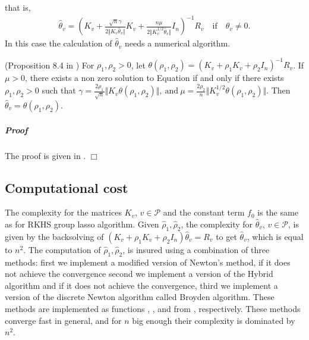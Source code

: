 that is, 
\begin{align}\label{tthatgrp}
\widehat{\theta}_v=(K_v+\frac{\sqrt{n}\gamma}{2\Vert K_v\widehat{\theta}_v\Vert}K_v+\frac{n\mu}{2\Vert K_v^{1/2}\widehat{\theta}_v\Vert}I_n)^{-1}R_v\quad \text{if}\quad \widehat{\theta}_v\neq0.
\end{align}
In this case the calculation of $\widehat{\theta}_v$ needs a numerical algorithm.
\begin{prop} (Proposition 8.4 in \citet{huet:hal-01434895})\label{theo:ttahatgrp}
For $\rho_1,\rho_2>0$, let $\theta(\rho_1,\rho_2)=(K_v+\rho_1K_v+\rho_2I_n)^{-1}R_v$. If $\mu>0$, there exists a non zero solution to Equation  if and only if there exists $\rho_1,\rho_2>0$ such that $\gamma=\frac{2\rho_1}{\sqrt{n}}\Vert K_v\theta(\rho_1,\rho_2)\Vert,\:\mbox{and}\:\mu=\frac{2\rho_2}{n}\Vert K^{1/2}_v\theta(\rho_1,\rho_2)\Vert.$ 
Then $\widehat{\theta}_v=\theta(\rho_1,\rho_2)$. 
\end{prop}
\subparagraph*{Proof} The proof is given in \citet{huet:hal-01434895}.
\hfill $\Box$ 

\subsection{Computational cost}
The complexity for the matrices $K_v$, $v\in\mathcal{P}$ and the constant term $f_0$ is the same as for RKHS group lasso algorithm. Given $\widehat{\rho}_1,\widehat{\rho}_2$, the complexity for $\widehat{\theta}_v$, $v\in\mathcal{P}$, is given by the backsolving of $(K_v+\rho_1K_v+\rho_2I_n)\widehat{\theta}_v=R_v$ to get $\widehat{\theta}_v$, which is equal to $n^2$.  The computation of $\widehat{\rho}_1,\widehat{\rho}_2$, is insured using a combination of three methods: first we implement a modified version of Newton's method, if it does not achieve the convergence second we implement a version of the Hybrid algorithm and if it does not achieve the convergence, third we implement a version of the discrete Newton algorithm called Broyden algorithm. These methods are implemented as functions , , and  from \citet{galassi2018scientific}, respectively. These methods converge fast in general, and for $n$ big enough their complexity is dominated by $n^2$.
